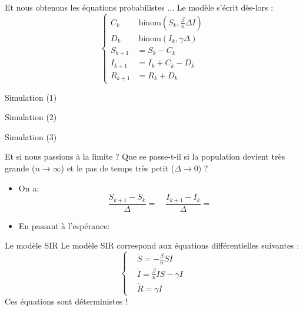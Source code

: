 \documentclass[10pt]{beamer}
\begin{document}
\begin{frame}{Et nous obtenons les équations probabilistes ...}
  Le modèle s'écrit dès-lors :
  \begin{equation}
    \left\{
      \begin{aligned}
        C_{k} &~ \text{binom}(S_k, \frac{\beta}{n}\Delta I) \\
        D_{k} &~ \text{binom}(I_k, \gamma \Delta) \\
        S_{k+1} &= S_k - C_k \\
        I_{k+1} &= I_k + C_k - D_k \\
        R_{k+1} &= R_k + D_k
      \end{aligned}
    \right.
  \end{equation}
\end{frame}

\begin{frame}{Simulation (1)}

\end{frame}

\begin{frame}{Simulation (2)}

\end{frame}

\begin{frame}{Simulation (3)}

\end{frame}

\begin{frame}{Et si nous passions à la limite ?}
  Que se passe-t-il si la population devient très grande ($n \to \infty$) et
  le pas de temps très petit ($\Delta \to 0$) ?
  \begin{itemize}
    \item On a:
    \[
      \dfrac{S_{k+1} - S_k}{\Delta} =
      \quad
      \dfrac{I_{k+1} - I_k}{\Delta} =

    \]
  \item En passant à l'espérance:

  \end{itemize}

\end{frame}

\begin{frame}{Le modèle SIR}
  Le modèle SIR correspond aux équations différentielles suivantes :
  \begin{equation}
    \left\{
      \begin{aligned}
        & \dot{S} = - \frac{\beta}{n} S I \\
        & \dot{I} = \frac{\beta}{n} I S - \gamma I \\
        & \dot{R} = \gamma I
      \end{aligned}
    \right.
  \end{equation}
  Ces équations sont déterministes !
\end{frame}
\end{document}
